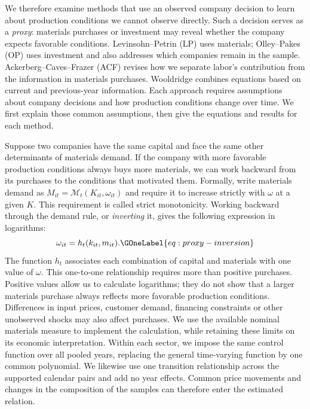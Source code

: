 We therefore examine methods that use an observed company decision to learn about production conditions we cannot observe directly. Such a decision serves as a \emph{proxy}: materials purchases or investment may reveal whether the company expects favorable conditions. Levinsohn--Petrin (LP) uses materials; Olley--Pakes (OP) uses investment and also addresses which companies remain in the sample. Ackerberg--Caves--Frazer (ACF) revises how we separate labor's contribution from the information in materials purchases. Wooldridge combines equations based on current and previous-year information. Each approach requires assumptions about company decisions and how production conditions change over time. We first explain those common assumptions, then give the equations and results for each method.

Suppose two companies have the same capital and face the same other determinants of materials demand. If the company with more favorable production conditions always buys more materials, we can work backward from its purchases to the conditions that motivated them. Formally, write materials demand as $M_{it}=\mathcal M_t(K_{it},\omega_{it})$ and require it to increase strictly with $\omega$ at a given $K$. This requirement is called strict monotonicity. Working backward through the demand rule, or \emph{inverting} it, gives the following expression in logarithms:
\begin{equation}
\omega_{it}=h_t(k_{it},m_{it}).
\GOneLabel{eq:proxy-inversion}
\end{equation}
The function $h_t$ associates each combination of capital and materials with one value of $\omega$. This one-to-one relationship requires more than positive purchases. Positive values allow us to calculate logarithms; they do not show that a larger materials purchase always reflects more favorable production conditions. Differences in input prices, customer demand, financing constraints or other unobserved shocks may also affect purchases. We use the available nominal materials measure to implement the calculation, while retaining these limits on its economic interpretation. Within each sector, we impose the same control function over all pooled years, replacing the general time-varying function by one common polynomial. We likewise use one transition relationship across the supported calendar pairs and add no year effects. Common price movements and changes in the composition of the samples can therefore enter the estimated relation.

